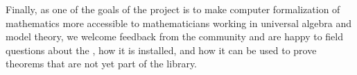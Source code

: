 \documentclass[a4paper,UKenglish,cleveref,autoref,thm-restate,11pt]{lipics-v2021}
\begin{document}

Finally, as one of the goals of the \agdaualib project is to make computer formalization of mathematics more accessible to mathematicians working in universal algebra and model theory, we welcome feedback from the community and are happy to field questions about the \ualib, how it is installed, and how it can be used to prove theorems that are not yet part of the library.





































\end{document}
